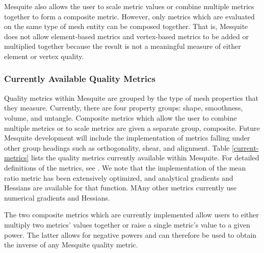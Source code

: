 Mesquite also allows the user to scale metric values or combine
multiple metrics together to form a composite metric.  However, only
metrics which are evaluated on the same type of mesh entity can be
composed together.  That is, Mesquite does not allow element-based
metrics and vertex-based metrics to be added or multiplied together
because the result is not a meaningful measure of either element or
vertex quality.

\subsubsection{Currently Available Quality Metrics}  
Quality metrics within
Mesquite are grouped by the type of mesh properties that they measure.
Currently, there are four property groups: shape, smoothness, volume,
and untangle.  Composite metrics which allow the user to combine
multiple metrics or to scale metrics are given a separate group,
composite.  Future Mesquite development will include the
implementation of metrics falling under other group headings such as
orthogonality, shear, and alignment.  Table \ref{current-metrics}
lists the quality metrics currently available within Mesquite.  For
detailed definitions of the metrics, see \cite{Kn01}.  We note that
the implementation of the mean ratio metric has been extensively
optimized, and analytical gradients and Hessians are available for
that function.  MAny other metrics currently use numerical gradients and
Hessians.

The two composite metrics which are currently implemented
allow users to either multiply two metrics' values
together or raise a single metric's value to a given power.
The latter allows for negative powers and can therefore be used
to obtain the inverse of any Mesquite quality metric.  

